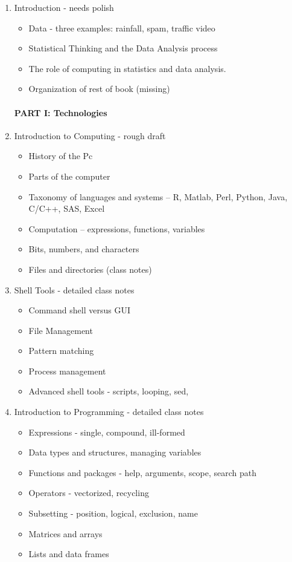 \documentclass[11pt,timesroman]{article}
\begin{document}
\begin{enumerate}

\item{Introduction - needs polish}
\begin{itemize}
        \item Data - three examples: rainfall, spam, traffic video
        \item Statistical Thinking and the Data Analysis process
        \item The role of computing in statistics and data analysis.
        \item Organization of rest of book (missing)
\end{itemize}

\paragraph{PART I: Technologies}

\item{Introduction to Computing - rough draft}
        \begin{itemize}
        \item History of the Pc
        \item Parts of the computer
        \item Taxonomy of languages and systems -- R, Matlab, Perl, Python, Java, C/C++, SAS, Excel
        \item Computation -- expressions, functions, variables 
        \item Bits, numbers, and characters
        \item Files and directories (class notes)
        \end{itemize}

\item{Shell Tools - detailed class notes}
        \begin{itemize}
        \item Command shell versus GUI
        \item File Management
        \item Pattern matching
        \item Process management 
        \item Advanced shell tools - scripts, looping, sed,
        \end{itemize}

\item{Introduction to Programming - detailed class notes}
        \begin{itemize}
        \item Expressions - single, compound, ill-formed
        \item Data types and structures, managing variables
        \item Functions and packages - help, arguments, scope, search path
        \item Operators - vectorized, recycling
        \item Subsetting - position, logical, exclusion, name
        \item Matrices and arrays
        \item Lists and data frames
        \end{itemize}


\end{enumerate}
\end{document}
